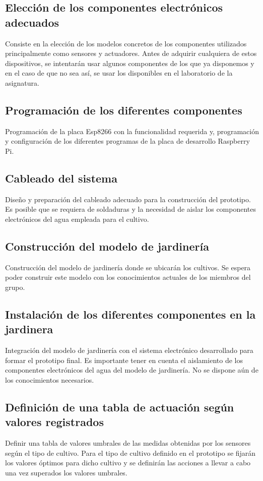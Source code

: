\documentclass[12pt,a4paper,titlepage,oneside]{report}
\begin{document}
	\subsection*{Elección de los componentes electrónicos adecuados}	
	Consiste en la elección de los modelos concretos de los componentes utilizados principalmente como sensores y actuadores. Antes de adquirir cualquiera de estos dispositivos, se intentarán usar algunos componentes de los que ya disponemos y en el caso de que no sea así, se usar los disponibles en el laboratorio de la asignatura. 

	\subsection*{Programación de los diferentes componentes}
		Programación de la placa Esp8266 con la funcionalidad requerida y, programación y configuración de los diferentes programas de la placa de desarrollo Raspberry Pi.
	
	\subsection*{Cableado del sistema}
	Diseño y preparación del cableado adecuado para la construcción del prototipo. Es posible que se requiera de soldaduras y la necesidad de aislar los componentes electrónicos del agua empleada para el cultivo.

	\subsection*{Construcción del modelo de jardinería}
	Construcción del modelo de jardinería donde se ubicarán los cultivos. Se espera poder construir este modelo con los conocimientos actuales de los miembros del grupo.

	\subsection*{Instalación de los diferentes componentes en la jardinera}
	Integración del modelo de jardinería con el sistema electrónico desarrollado para formar el prototipo final. Es importante tener en cuenta el aislamiento de los componentes electrónicos del agua del modelo de jardinería. No se dispone aún de los conocimientos necesarios.

\subsection*{Definición de una tabla de actuación según valores registrados}
	Definir una tabla de valores umbrales de las medidas obtenidas por los sensores según el tipo de cultivo. Para el tipo de cultivo definido en el prototipo se fijarán los valores óptimos para dicho cultivo y se definirán las acciones a llevar a cabo una vez superados los valores umbrales.
	
\end{document}
